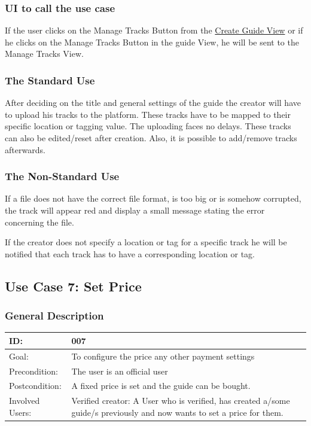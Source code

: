 \documentclass[12pt]{article}
\theoremstyle{definition}
\newenvironment{text}{
   \setlength{\parindent}{0pt}
   \color{black}
}{}
\begin{document}
    \subsubsection{UI to call the use case}
    \begin{text}
    If the user clicks on the Manage Tracks Button from the \hyperref[fig:create_guide]{Create Guide View} or if he clicks on the Manage Tracks Button in the guide View, he will be sent to the Manage Tracks View.
    \end{text}
    \newline
    \newline
    
    \subsubsection{The Standard Use}
    \begin{text}
    After deciding on the title and general settings of the guide the creator will have to upload his tracks to the platform. These tracks have to be mapped to their specific location or tagging value. The uploading faces no delays. These tracks can also be edited/reset after creation. Also, it is possible to add/remove tracks afterwards.  
    \end{text}
    
    \subsubsection{The Non-Standard Use}
    \label{sec:managetracks_nsu}
    \begin{text}
    If a file does not have the correct file format, is too big or is somehow corrupted, the track will appear red and display a small message stating the error concerning the file.
    
    If the creator does not specify a location or tag for a specific track he will be notified that each track has to have a corresponding location or tag.
    \end{text}

\subsection{Use Case 7: Set Price}
    \subsubsection{General Description}

    
    \begin{tabular}{|p{.2\linewidth}|p{.65\linewidth}|}
    \hline 
    ID: & 007 \\ \hline
    Goal: & To configure the price any other payment settings \\ \hline
    Precondition: & The user is an official user \\ \hline
    Postcondition: &  A fixed price is set and the guide can be bought. \\ \hline
    Involved Users: & Verified creator: A User who is verified, has created a/some guide/s previously and now wants to set a price for them. \\ \hline
    \end{tabular}
    
\end{document}
